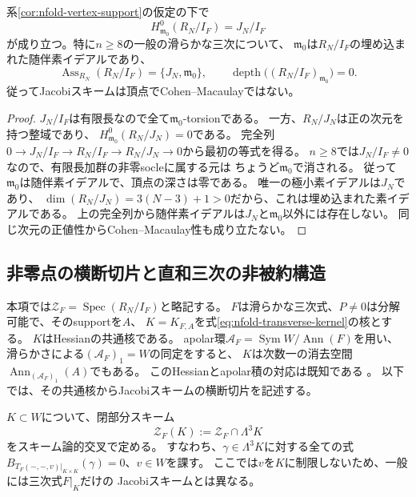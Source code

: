 \begin{corollary}[頂点の局所コホモロジー]\label{cor:nfold-embedded-vertex}
系\ref{cor:nfold-vertex-support}の仮定の下で
\[
 H^0_{\mathfrak m_0}(R_N/I_F)=J_N/I_F
\]
が成り立つ。特に$n\ge8$の一般の滑らかな三次について、
$\mathfrak m_0$は$R_N/I_F$の埋め込まれた随伴素イデアルであり、
\[
 \operatorname{Ass}_{R_N}(R_N/I_F)=\{J_N,\mathfrak m_0\},\qquad
 \operatorname{depth}\bigl((R_N/I_F)_{\mathfrak m_0}\bigr)=0.
\]
従ってJacobiスキームは頂点でCohen--Macaulayではない。
\end{corollary}
\begin{proof}
$J_N/I_F$は有限長なので全て$\mathfrak m_0$-torsionである。
一方、$R_N/J_N$は正の次元を持つ整域であり、
$H^0_{\mathfrak m_0}(R_N/J_N)=0$である。
完全列
$0\to J_N/I_F\to R_N/I_F\to R_N/J_N\to0$から最初の等式を得る。
$n\ge8$では$J_N/I_F\ne0$なので、有限長加群の非零socleに属する元は
ちょうど$\mathfrak m_0$で消される。
従って$\mathfrak m_0$は随伴素イデアルで、頂点の深さは零である。
唯一の極小素イデアルは$J_N$であり、
$\dim(R_N/J_N)=3(N-3)+1>0$だから、これは埋め込まれた素イデアルである。
上の完全列から随伴素イデアルは$J_N$と$\mathfrak m_0$以外には存在しない。
同じ次元の正値性からCohen--Macaulay性も成り立たない。
\end{proof}

\subsection{非零点の横断切片と直和三次の非被約構造}

本項では$\mathcal Z_F=\operatorname{Spec}(R_N/I_F)$と略記する。
$F$は滑らかな三次式、$P\ne0$は分解可能で、そのsupportを$A$、
$K=K_{F,A}$を式\eqref{eq:nfold-transverse-kernel}の核とする。
$K$はHessianの共通核である。
apolar環$\mathcal A_F=\operatorname{Sym}W/\operatorname{Ann}(F)$を用い、
滑らかさによる$(\mathcal A_F)_1=W$の同定をすると、
$K$は次数一の消去空間$\operatorname{Ann}_{(\mathcal A_F)_1}(A)$でもある。
このHessianとapolar積の対応は既知である
\cite[Proposition~2.1]{NFMBFFHessian}。
以下では、その共通核からJacobiスキームの横断切片を記述する。

$K\subset W$について、閉部分スキーム
\[
 \mathcal Z_F(K):=\mathcal Z_F\cap\Lambda^3K
\]
をスキーム論的交叉で定める。
すなわち、$\gamma\in\Lambda^3K$に対する全ての式
$B_{T_F(-,-,v)|_{K\times K}}(\gamma)=0$、$v\in W$を課す。
ここでは$v$を$K$に制限しないため、一般には三次式$F|_K$だけの
Jacobiスキームとは異なる。

